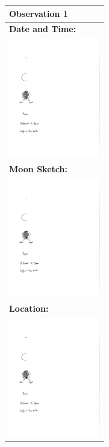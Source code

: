 \documentclass[11pt]{article}
\begin{document}
\enlargethispage*{1000pt}
\vspace*{0.5cm}

\noindent
\begin{minipage}{4.5cm}
\begin{center}
\begin{tabular}{|l|}
\hline 
 \textbf{Observation 1}
 \\
 \hline\hline
\textbf{Date and Time:}\\
\includegraphics[width=4cm]{date_time}
\\
\textbf{Moon Sketch:} \\
\includegraphics[width=4cm]{moon_sketch}\\
\textbf{Location:} \\
\includegraphics[width=4cm]{location}
\\\hline
\end{tabular}
\end{center}
\end{minipage}
\quad
\end{document}

